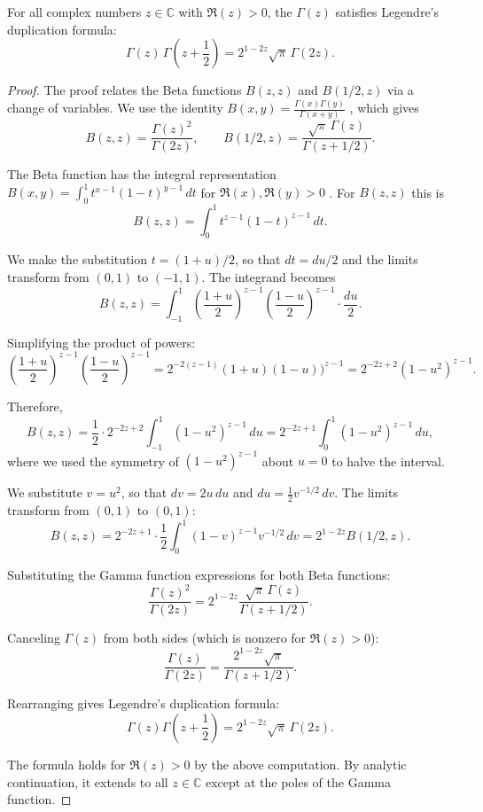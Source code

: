 \begin{proposition} \label{proposition:legendres_duplication_formula_for_gamma_function}
	For all complex numbers $z \in \mathbb{C}$ with $\Re(z) > 0$, the  $\Gamma(z)$ satisfies Legendre's duplication formula:
	$$
	\boxed{\Gamma(z) \, \Gamma\!\left( z + \frac{1}{2} \right) = 2^{1 - 2z} \sqrt{\pi} \, \Gamma(2z).}
	$$
\end{proposition}

\begin{proof}
	The proof relates the Beta functions $B(z,z)$ and $B(1/2, z)$ via a change of variables. We use the identity $B(x,y) = \frac{\Gamma(x)\Gamma(y)}{\Gamma(x+y)}$ , which gives
	$$B(z,z) = \frac{\Gamma(z)^2}{\Gamma(2z)}, \qquad B(1/2, z) = \frac{\sqrt{\pi}\,\Gamma(z)}{\Gamma(z+1/2)}.$$

	The Beta function has the integral representation $B(x,y) = \int_0^1 t^{x-1}(1-t)^{y-1}\,dt$ for $\Re(x), \Re(y) > 0$ . For $B(z,z)$ this is
	$$B(z,z) = \int_0^1 t^{z-1}(1-t)^{z-1}\,dt.$$

	We make the substitution $t = (1+u)/2$, so that $dt = du/2$ and the limits transform from $(0,1)$ to $(-1,1)$. The integrand becomes
	$$B(z,z) = \int_{-1}^1 \left(\frac{1+u}{2}\right)^{z-1} \left(\frac{1-u}{2}\right)^{z-1} \cdot \frac{du}{2}.$$

	Simplifying the product of powers:
	$$\left(\frac{1+u}{2}\right)^{z-1} \left(\frac{1-u}{2}\right)^{z-1} = 2^{-2(z-1)} (1+u)(1-u))^{z-1} = 2^{-2z+2}(1-u^2)^{z-1}.$$

	Therefore,
	$$B(z,z) = \frac{1}{2} \cdot 2^{-2z+2} \int_{-1}^1 (1-u^2)^{z-1}\,du = 2^{-2z+1} \int_0^1 (1-u^2)^{z-1}\,du,$$
	where we used the symmetry of $(1-u^2)^{z-1}$ about $u=0$ to halve the interval.

	We substitute $v = u^2$, so that $dv = 2u\,du$ and $du = \frac{1}{2}v^{-1/2}\,dv$. The limits transform from $(0,1)$ to $(0,1)$:
	$$B(z,z) = 2^{-2z+1} \cdot \frac{1}{2} \int_0^1 (1-v)^{z-1} v^{-1/2}\,dv = 2^{1-2z} B(1/2, z).$$

	Substituting the Gamma function expressions for both Beta functions:
	$$\frac{\Gamma(z)^2}{\Gamma(2z)} = 2^{1-2z} \frac{\sqrt{\pi}\,\Gamma(z)}{\Gamma(z+1/2)}.$$

	Canceling $\Gamma(z)$ from both sides (which is nonzero for $\Re(z) > 0$):
	$$\frac{\Gamma(z)}{\Gamma(2z)} = \frac{2^{1-2z}\sqrt{\pi}}{\Gamma(z+1/2)}.$$

	Rearranging gives Legendre's duplication formula:
	$$\Gamma(z)\Gamma\!\left(z+\frac{1}{2}\right) = 2^{1-2z}\sqrt{\pi}\,\Gamma(2z).$$

	The formula holds for $\Re(z) > 0$ by the above computation. By analytic continuation, it extends to all $z \in \mathbb{C}$ except at the poles of the Gamma function.
\end{proof}
